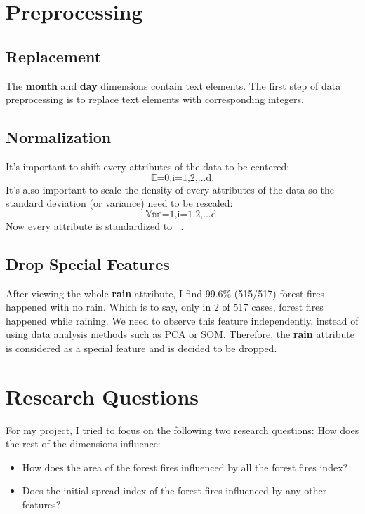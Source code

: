\documentclass[titlepage,a4paper,12pt,thmsb]{report}
\begin{document}

\chapter*{Preprocessing}

\section*{Replacement}

The {\bf month} and {\bf day} dimensions contain text elements. The first step of data preprocessing is to replace text elements with corresponding integers.

\section*{Normalization}

It's important to shift every attributes of the data to be centered:
$$\mathop{\mathbb{E}[X_i] = 0, i = 1,2,...d.}$$It's also important to scale the density of every attributes of the data so the standard deviation (or variance) need to be rescaled: $$\mathop{\mathbb{Var}[X_i] = 1, i = 1,2,...d.}$$Now every attribute is standardized to $\mathop{\frac{X_i - \mu}{\sigma}}$.

\section*{Drop Special Features}

After viewing the whole {\bf rain} attribute, I find 99.6\% (515/517) forest fires happened with no rain. Which is to say, only in 2 of 517 cases, forest fires happened while raining. We need to observe this feature independently, instead of using data analysis methods such as PCA or SOM. Therefore, the {\bf rain} attribute is considered as a special feature and is decided to be dropped.



\chapter*{Research Questions}

For my project, I tried to focus on the following two research questions:
\newline{}
\newline{}
{How does the rest of the dimensions influence:}

\begin{itemize}
\item{How does the area of the forest fires influenced by all the forest fires index?}
\item{Does the initial spread index of the forest fires influenced by any other features?}
\end{itemize}
\end{document}
